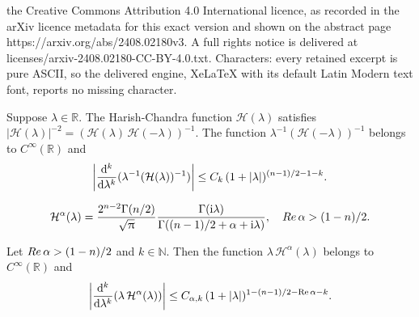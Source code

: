 \documentclass[10pt,a4paper]{amsart}
\newcommand{\R}{\mathbb{R}}
\newcommand{\bc}{{ \mathcal{H} }}
\renewcommand{\Re}{\mathop{\mathrm{Re}}}
\renewcommand{\d}{\mathrm{d}}
\renewcommand{\i}{\mathrm{i}}
\begin{document}
the Creative Commons Attribution 4.0 International licence, as recorded in the arXiv licence metadata for this exact version and shown on the abstract page https://arxiv.org/abs/2408.02180v3. A full rights notice is delivered at licenses/arxiv-2408.02180-CC-BY-4.0.txt. Characters: every retained excerpt is pure ASCII, so the delivered engine, XeLaTeX with its default Latin Modern text font, reports no missing character.
\begin{lem}\label{lem:2.0}
Suppose $\lambda\in \R$.
The Harish-Chandra function $\bc(\lambda)$ satisfies
$
|\bc(\lambda)|^{-2}=(\bc(\lambda)\,\bc(-\lambda))^{-1}.
$
The function $ \lambda^{-1}(\bc(-\lambda))^{-1}$ belongs to $C^\infty(\R)$ and
\begin{eqnarray*}
\left|{\d^k\over\d\lambda^k}(\lambda^{-1}(\bc(\lambda))^{-1})\right|\leq C_k\,(1+|\lambda|)^{(n-1)/2-1-k}.
\end{eqnarray*}
\end{lem}

\begin{eqnarray}\label{e2.2}
\bc^\alpha(\lambda)={2^{n-2}\Gamma(n/2)\over \sqrt{\uppi}}{\Gamma(\i\lambda)\over\Gamma((n-1)/2+\alpha+\i\lambda)}, \ \ \  {\rm Re}\, \alpha>{(1-n)/2}.
\end{eqnarray} 

\begin{lem}\label{lem:2.1}
Let  ${\rm Re}\, \alpha>{(1-n)/2}$ and $k\in{\mathbb N}$.  Then the  function $  \lambda\,\bc^\alpha(\lambda)$ belongs to $C^\infty(\R)$ and
\begin{eqnarray*}
\left|{\d^k\over\d\lambda^k}(\lambda \,\bc^\alpha(\lambda))\right|\leq C_{\alpha,k}\,(1+|\lambda|)^{1-(n-1)/2-\Re\alpha-k}.
\end{eqnarray*}


\end{lem}
\end{document}
